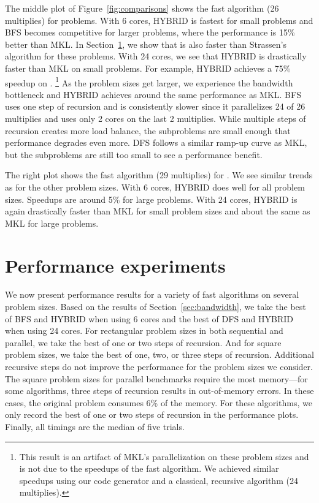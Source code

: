 \documentclass[preprint]{sigplanconf}
\begin{document}
The middle plot of Figure~\ref{fig:comparisons} shows the  fast algorithm (26 multiplies) for  problems.
With 6 cores, HYBRID is fastest for small problems and BFS becomes competitive for larger problems,
where the performance is 15\% better than MKL.
In Section~\ref{sec:performance}, we show that  is also faster than Strassen's algorithm for these problems.
With 24 cores, we see that HYBRID is drastically faster than MKL on small problems.
For example, HYBRID achieves a 75\% speedup on . \footnote{
This result is an artifact of MKL's parallelization on these problem sizes and is not due to the speedups of the fast algorithm.
We achieved similar speedups using our code generator and a classical,  recursive algorithm (24 multiplies).
}
As the problem sizes get larger, we experience the bandwidth bottleneck and HYBRID achieves around the same performance as MKL.
BFS uses one step of recursion and is consistently slower since it parallelizes 24 of 26 multiplies and uses only 2 cores on the last 2 multiplies.
While multiple steps of recursion creates more load balance, the subproblems are small enough that performance degrades even more.
DFS follows a similar ramp-up curve as MKL, but the subproblems are still too small to see a performance benefit.

The right plot shows the  fast algorithm (29 multiplies) for .
We see similar trends as for the other problem sizes.
With 6 cores, HYBRID does well for all problem sizes.
Speedups are around  5\% for large problems.
With 24 cores, HYBRID is again drastically faster than MKL for small problem sizes and about the same as MKL for large problems.

\section{Performance experiments}
\label{sec:performance}

We now present performance results for a variety of fast algorithms on several problem sizes.
Based on the results of Section~\ref{sec:bandwidth},
we take the best of BFS and HYBRID when using 6 cores and the best of DFS and HYBRID when using 24 cores.
For rectangular problem sizes in both sequential and parallel, we take the best of one or two steps of recursion.
And for square problem sizes, we take the best of one, two, or three steps of recursion.
Additional recursive steps do not improve the performance for the problem sizes we consider.
The square problem sizes for parallel benchmarks require the most memory---for some algorithms, three steps of recursion results in out-of-memory errors.
In these cases, the original problem consumes 6\% of the memory.
For these algorithms, we only record the best of one or two steps of recursion in the performance plots.
Finally, all timings are the median of five trials.
\end{document}
